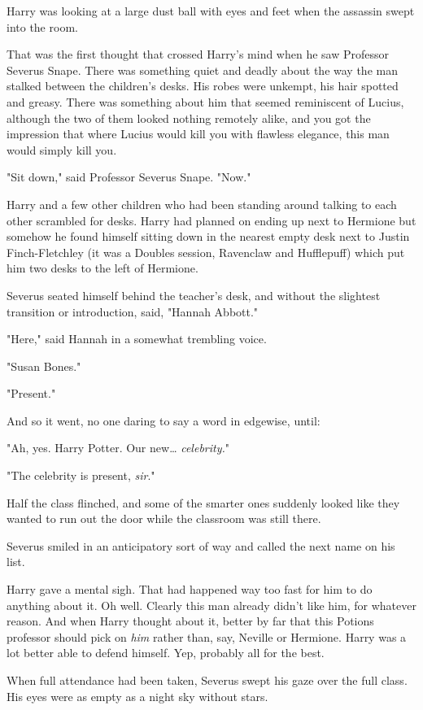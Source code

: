 Harry was looking at a large dust ball with eyes and feet when the assassin 
swept into the room.

That was the first thought that crossed Harry's mind when he saw Professor 
Severus Snape. There was something quiet and deadly about the way the man 
stalked between the children's desks. His robes were unkempt, his hair spotted 
and greasy. There was something about him that seemed reminiscent of Lucius, 
although the two of them looked nothing remotely alike, and you got the 
impression that where Lucius would kill you with flawless elegance, this man 
would simply kill you.

"Sit down," said Professor Severus Snape. "Now."

Harry and a few other children who had been standing around talking to each 
other scrambled for desks. Harry had planned on ending up next to Hermione but 
somehow he found himself sitting down in the nearest empty desk next to Justin 
Finch-Fletchley (it was a Doubles session, Ravenclaw and Hufflepuff) which put 
him two desks to the left of Hermione.

Severus seated himself behind the teacher's desk, and without the slightest 
transition or introduction, said, "Hannah Abbott."

"Here," said Hannah in a somewhat trembling voice.

"Susan Bones."

"Present."

And so it went, no one daring to say a word in edgewise, until:

"Ah, yes. Harry Potter. Our new{\ldots} \emph{celebrity.}"

"The celebrity is present, \emph{sir}."

Half the class flinched, and some of the smarter ones suddenly looked like they 
wanted to run out the door while the classroom was still there.

Severus smiled in an anticipatory sort of way and called the next name on his 
list.

Harry gave a mental sigh. That had happened way too fast for him to do anything 
about it. Oh well. Clearly this man already didn't like him, for whatever 
reason. And when Harry thought about it, better by far that this Potions 
professor should pick on \emph{him} rather than, say, Neville or Hermione. 
Harry was a lot better able to defend himself. Yep, probably all for the best.

When full attendance had been taken, Severus swept his gaze over the full 
class. His eyes were as empty as a night sky without stars.

